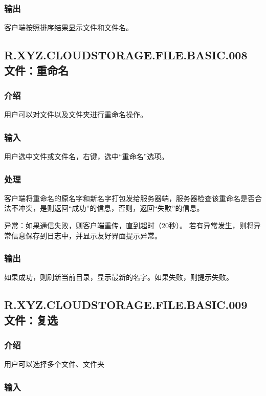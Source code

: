 \subsubsection{输出}
客户端按照排序结果显示文件和文件名。



\subsection{R.XYZ.CLOUDSTORAGE.FILE.BASIC.008 文件：重命名}

\subsubsection{介绍} 
用户可以对文件以及文件夹进行重命名操作。

\subsubsection{输入} 
用户选中文件或文件名，右键，选中“重命名”选项。

\subsubsection{处理}
客户端将重命名的原名字和新名字打包发给服务器端，服务器检查该重命名是否合法不冲突，是则返回“成功”的信息，否则，返回“失败”的信息。

异常：如果通信失败，则客户端重传，直到超时（20秒）。
若有异常发生，则将异常信息保存到日志中，并显示友好界面提示异常。

\subsubsection{输出}
如果成功，则刷新当前目录，显示最新的名字。如果失败，则提示失败。



\subsection{R.XYZ.CLOUDSTORAGE.FILE.BASIC.009 文件：复选}

\subsubsection{介绍}

用户可以选择多个文件、文件夹

\subsubsection{输入}

